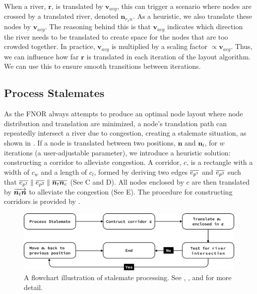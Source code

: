 \documentclass[Afour,sagev,times]{sagej}
\newcommand{\Vector}[1]{\protect\overrightarrow{#1}}
\newcommand{\Line}[1]{\protect\overline{#1}}
\newcommand{\stalemateMax}{w}
\newcommand{\node}{\bm{n}}
\newcommand{\nodeFNOR}{\node_t}
\newcommand{\nodeVectorTC}{\Vector{\nodeFNOR\node}}
\newcommand{\river}{\bm{r}}
\newcommand{\Corridor}{c}
\newcommand{\CorridorLength}{\Corridor_l}
\newcommand{\CorridorWidth}{\Corridor_w}
\newcommand{\PointP}{\node_c}
\newcommand{\EdgeParallelA}{\Line{e_{p^1}}}
\newcommand{\EdgeParallelB}{\Line{e_{p^2}}}
\newcommand{\nodeLineNtNc}{\Line{\nodeFNOR\PointP}}
\newcommand{\vectorAvg}{\bm{v}_{avg}}
\newcommand{\RxN}{\node_{r_{x}n}}
\begin{document}
When a river, $ \river $, is translated by $ \vectorAvg $, this can trigger a scenario where nodes are crossed by a translated river, denoted $ \RxN $.
As a heuristic, we also translate these nodes by $ \vectorAvg $.
The reasoning behind this is that $ \vectorAvg $ indicates which direction the river needs to be translated to create space for the nodes that are too crowded together.
In practice, $ \vectorAvg $ is multiplied by a scaling factor $ \propto\vectorAvg $.
Thus, we can influence how far $ \river $ is translated in each iteration of the layout algorithm.
We can use this to ensure smooth transitions between iterations.

\subsection{Process Stalemates}
\label{subsec:{Process Stalemates}}

As the FNOR always attempts to produce an optimal node layout where node distribution and translation are minimized, a node's translation path can repeatedly intersect a river due to congestion, creating a stalemate situation, as shown in .
If a node is translated between two positions, $ \node $ and $ \nodeFNOR $, for $ \stalemateMax $ iterations (a user-adjustable parameter), we introduce a heuristic solution: constructing a corridor to alleviate congestion.
A corridor, $ \Corridor $, is a rectangle with a width of $ \CorridorWidth $ and a length of $ \CorridorLength $, formed by deriving two edges $ \EdgeParallelA $ and $ \EdgeParallelB $ such that $ \EdgeParallelA \parallel \EdgeParallelB \parallel \nodeLineNtNc $ (See C and D).
All nodes enclosed by $ \Corridor $ are then translated by $ \nodeVectorTC $ to alleviate the congestion (See E).
The procedure for constructing corridors is provided by .

{
\begin{figure}[tb!]
    \centering
    \includegraphics[width=\columnwidth,keepaspectratio]{flowchart stalemate.png}
    \caption{A flowchart illustration of stalemate processing.
    See , , and  for more detail.}
    \label{fig:flowchart-stalemate}
\end{figure}
}
\end{document}
